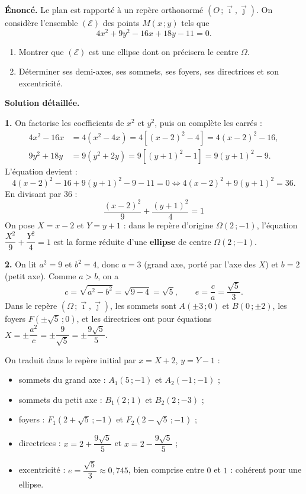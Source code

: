 \documentclass[11pt]{article}
\begin{document}
\begin{exoresolu}
\textbf{Énoncé.} Le plan est rapporté à un repère orthonormé $(O\,;\vec{\imath},\vec{\jmath})$. On considère l'ensemble $(\mathcal{E})$ des points $M(x\,;y)$ tels que
\[ 4x^2+9y^2-16x+18y-11=0. \]
\begin{enumerate}
\item Montrer que $(\mathcal{E})$ est une ellipse dont on précisera le centre $\Omega$.
\item Déterminer ses demi-axes, ses sommets, ses foyers, ses directrices et son excentricité.
\end{enumerate}
\tcblower
\textbf{Solution détaillée.}

\textbf{1.} On factorise les coefficients de $x^2$ et $y^2$, puis on complète les carrés :
\begin{align*}
4x^2-16x &= 4\left(x^2-4x\right)=4\left[(x-2)^2-4\right]=4(x-2)^2-16,\\
9y^2+18y &= 9\left(y^2+2y\right)=9\left[(y+1)^2-1\right]=9(y+1)^2-9.
\end{align*}
L'équation devient :
\[ 4(x-2)^2-16+9(y+1)^2-9-11=0
\iff 4(x-2)^2+9(y+1)^2=36. \]
En divisant par $36$ :
\[ \boxed{\ \dfrac{(x-2)^2}{9}+\dfrac{(y+1)^2}{4}=1\ } \]
On pose $X=x-2$ et $Y=y+1$ : dans le repère d'origine $\Omega(2\,;-1)$, l'équation $\dfrac{X^2}{9}+\dfrac{Y^2}{4}=1$ est la forme réduite d'une \textbf{ellipse} de centre $\Omega(2\,;-1)$.

\textbf{2.} On lit $a^2=9$ et $b^2=4$, donc $a=3$ (grand axe, porté par l'axe des $X$) et $b=2$ (petit axe). Comme $a>b$, on a
\[ c=\sqrt{a^2-b^2}=\sqrt{9-4}=\sqrt{5}, \qquad e=\dfrac{c}{a}=\dfrac{\sqrt{5}}{3}. \]
Dans le repère $(\Omega\,;\vec{\imath},\vec{\jmath})$, les sommets sont $A(\pm 3\,;0)$ et $B(0\,;\pm 2)$, les foyers $F(\pm\sqrt{5}\,;0)$, et les directrices ont pour équations $X=\pm\dfrac{a^2}{c}=\pm\dfrac{9}{\sqrt{5}}=\pm\dfrac{9\sqrt{5}}{5}$.

On traduit dans le repère initial par $x=X+2$, $y=Y-1$ :
\begin{itemize}
\item sommets du grand axe : $A_1(5\,;-1)$ et $A_2(-1\,;-1)$ ;
\item sommets du petit axe : $B_1(2\,;1)$ et $B_2(2\,;-3)$ ;
\item foyers : $F_1(2+\sqrt{5}\,;-1)$ et $F_2(2-\sqrt{5}\,;-1)$ ;
\item directrices : $x=2+\dfrac{9\sqrt{5}}{5}$ et $x=2-\dfrac{9\sqrt{5}}{5}$ ;
\item excentricité : $e=\dfrac{\sqrt{5}}{3}\approx 0{,}745$, bien comprise entre $0$ et $1$ : cohérent pour une ellipse.
\end{itemize}
\end{exoresolu}
\end{document}
